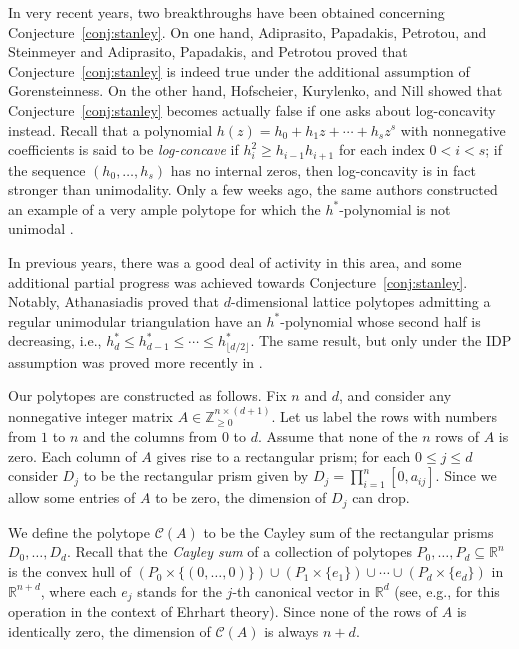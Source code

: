 \documentclass[11pt, letterpaper, english]{amsart}
\theoremstyle{teoremas}
\theoremstyle{definition}
\begin{document}
In very recent years, two breakthroughs have been obtained concerning Conjecture~\ref{conj:stanley}. On one hand, Adiprasito, Papadakis, Petrotou, and Steinmeyer \cite{adiprasito-papadakis-petrotou-steinmeyer} and Adiprasito, Papadakis, and Petrotou \cite{adiprasito-papadakis-petrotou} proved that Conjecture~\ref{conj:stanley} is indeed true under the additional assumption of Gorensteinness. On the other hand, Hofscheier, Kurylenko, and Nill \cite{hofscheier-kurylenko-nill1} showed that Conjecture~\ref{conj:stanley} becomes actually false if one asks about log-concavity instead. Recall that a polynomial $h(z) = h_0 + h_1z+\cdots+h_sz^s$ with nonnegative coefficients is said to be \emph{log-concave} if $h_i^2\geq h_{i-1}h_{i+1}$ for each index $0< i < s$; if the sequence $(h_0,\ldots,h_s)$ has no internal zeros, then log-concavity is in fact stronger than unimodality. Only a few weeks ago, the same authors constructed an example of a very ample polytope for which the $h^*$-polynomial is not unimodal \cite{hofscheier-kurylenko-nill2}.

In previous years, there was a good deal of activity in this area, and some additional partial progress was achieved towards Conjecture~\ref{conj:stanley}. Notably, Athanasiadis \cite[Theorem~1.3]{athanasiadis} proved that $d$-dimensional lattice polytopes admitting a regular unimodular triangulation have an $h^*$-polynomial whose second half is decreasing, i.e., $h^*_d \leq h^*_{d-1} \leq \cdots \leq h^*_{\lfloor d/2\rfloor}$. The same result, but only under the IDP assumption was proved more recently in \cite[Corollary~2.2]{adiprasito-papadakis-petrotou}.

Our polytopes are constructed as follows. Fix $n$ and $d$, and consider any nonnegative integer matrix $A\in \mathbb{Z}_{\geq 0}^{n\times(d+1)}$. Let us label the rows with numbers from $1$ to $n$ and the columns from $0$ to $d$. Assume that none of the $n$ rows of $A$ is zero. Each column of $A$ gives rise to a rectangular prism; for each $0\leq j\leq d$ consider $D_j$ to be the rectangular prism given by $D_j = \prod_{i=1}^n [0,a_{ij}]$. Since we allow some entries of $A$ to be zero, the dimension of $D_j$ can drop.

We define the polytope $\mathcal{C}(A)$ to be the Cayley sum of the rectangular prisms $D_0,\ldots, D_d$. Recall that the \emph{Cayley sum} of a collection of polytopes $P_0,\ldots, P_d\subseteq \mathbb{R}^n$ is the convex hull of $(P_0\times \{(0,\ldots,0)\})\cup (P_1\times \{e_1\}) \cup\cdots\cup (P_d\times \{e_d\})$ in $\mathbb{R}^{n+d}$, where each $e_j$ stands for the $j$-th canonical vector in $\mathbb{R}^d$ (see, e.g., \cite{haase-nill-payne} for this operation in the context of Ehrhart theory). Since none of the rows of $A$ is identically zero, the dimension of $\mathcal{C}(A)$ is always $n+d$.
\end{document}
